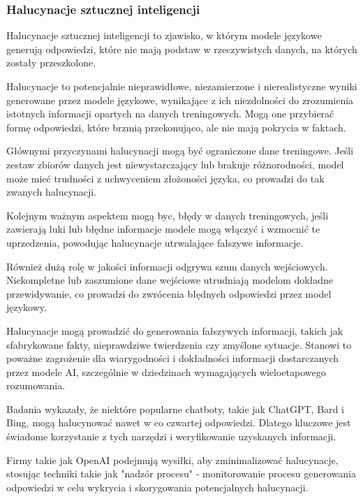 \subsubsection{Halucynacje sztucznej inteligencji}
Halucynacje sztucznej inteligencji to zjawisko, w którym modele językowe generują odpowiedzi, które nie mają podstaw w rzeczywistych danych, na których zostały przeszkolone.

Halucynacje to potencjalnie nieprawidłowe, niezamierzone i nierealistyczne wyniki generowane przez modele językowe, wynikające z ich niezdolności do zrozumienia istotnych informacji opartych na danych treningowych. Mogą one przybierać formę odpowiedzi, które brzmią przekonująco, ale nie mają pokrycia w faktach.

Głównymi przyczynami halucynacji mogą być ograniczone dane treningowe. Jeśli zestaw zbiorów danych jest niewystarczający lub brakuje różnorodności, model może mieć trudności z uchwyceniem złożoności języka, co prowadzi do tak zwanych halucynacji.

Kolejnym ważnym aspektem mogą byc, błędy w danych treningowych, jeśli zawierają luki lub błędne informacje modele mogą włączyć i wzmocnić te uprzedzenia, powodując halucynacje utrwalające fałszywe informacje.

Również dużą rolę w jakości informacji odgrywa szum danych wejściowych. Niekompletne lub zaszumione dane wejściowe utrudniają modelom dokładne przewidywanie, co prowadzi do zwrócenia błędnych odpowiedzi przez model językowy.

Halucynacje mogą prowadzić do generowania fałszywych informacji, takich jak sfabrykowane fakty, nieprawdziwe twierdzenia czy zmyślone sytuacje. Stanowi to poważne zagrożenie dla wiarygodności i dokładności informacji dostarczanych przez modele AI, szczególnie w dziedzinach wymagających wieloetapowego rozumowania.

Badania wykazały, że niektóre popularne chatboty, takie jak ChatGPT, Bard i Bing, mogą halucynować nawet w co czwartej odpowiedzi. Dlatego kluczowe jest świadome korzystanie z tych narzędzi i weryfikowanie uzyskanych informacji.

Firmy takie jak OpenAI podejmują wysiłki, aby zminimalizować halucynacje, stosując techniki takie jak "nadzór procesu" - monitorowanie procesu generowania odpowiedzi w celu wykrycia i skorygowania potencjalnych halucynacji.

